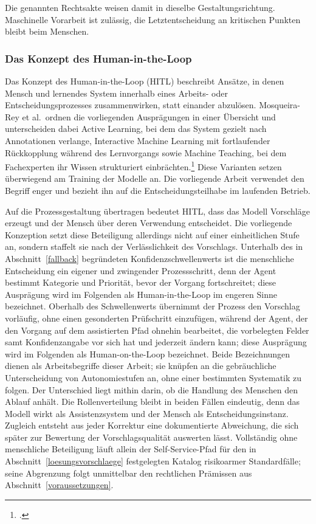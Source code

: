 Die genannten Rechtsakte weisen damit in dieselbe Gestaltungsrichtung. Maschinelle Vorarbeit ist zul\"assig, die Letztentscheidung an kritischen Punkten bleibt beim Menschen.

\subsubsection{Das Konzept des \glqq Human-in-the-Loop\grqq{}}
\label{hitl}

Das Konzept des Human-in-the-Loop (HITL) beschreibt Ans\"atze, in denen Mensch und lernendes System innerhalb eines Arbeits- oder Entscheidungsprozesses zusammenwirken, statt einander abzul\"osen. Mosqueira-Rey et al.~ordnen die vorliegenden Auspr\"agungen in einer \"Ubersicht und unterscheiden dabei Active Learning, bei dem das System gezielt nach Annotationen verlange, Interactive Machine Learning mit fortlaufender R\"uckkopplung w\"ahrend des Lernvorgangs sowie Machine Teaching, bei dem Fachexperten ihr Wissen strukturiert einbr\"achten.\footcite[Vgl.][hier S.~3006]{MosqueiraRey2023} Diese Varianten setzen \"uberwiegend am Training der Modelle an. Die vorliegende Arbeit verwendet den Begriff enger und bezieht ihn auf die Entscheidungsteilhabe im laufenden Betrieb.

Auf die Prozessgestaltung \"ubertragen bedeutet HITL, dass das Modell Vorschl\"age erzeugt und der Mensch \"uber deren Verwendung entscheidet. Die vorliegende Konzeption setzt diese Beteiligung allerdings nicht auf einer einheitlichen Stufe an, sondern staffelt sie nach der Verl\"asslichkeit des Vorschlags. Unterhalb des in Abschnitt~\ref{fallback} begr\"undeten Konfidenzschwellenwerts ist die menschliche Entscheidung ein eigener und zwingender Prozessschritt, denn der Agent bestimmt Kategorie und Priorit\"at, bevor der Vorgang fortschreitet; diese Auspr\"agung wird im Folgenden als Human-in-the-Loop im engeren Sinne bezeichnet. Oberhalb des Schwellenwerts \"ubernimmt der Prozess den Vorschlag vorl\"aufig, ohne einen gesonderten Pr\"ufschritt einzuf\"ugen, w\"ahrend der Agent, der den Vorgang auf dem assistierten Pfad ohnehin bearbeitet, die vorbelegten Felder samt Konfidenzangabe vor sich hat und jederzeit \"andern kann; diese Auspr\"agung wird im Folgenden als Human-on-the-Loop bezeichnet. Beide Bezeichnungen dienen als Arbeitsbegriffe dieser Arbeit; sie kn\"upfen an die gebr\"auchliche Unterscheidung von Autonomiestufen an, ohne einer bestimmten Systematik zu folgen. Der Unterschied liegt mithin darin, ob die Handlung des Menschen den Ablauf anh\"alt. Die Rollenverteilung bleibt in beiden F\"allen eindeutig, denn das Modell wirkt als Assistenzsystem und der Mensch als Entscheidungsinstanz. Zugleich entsteht aus jeder Korrektur eine dokumentierte Abweichung, die sich sp\"ater zur Bewertung der Vorschlagsqualit\"at auswerten l\"asst. Vollst\"andig ohne menschliche Beteiligung l\"auft allein der Self-Service-Pfad f\"ur den in Abschnitt~\ref{loesungsvorschlaege} festgelegten Katalog risikoarmer Standardf\"alle; seine Abgrenzung folgt unmittelbar den rechtlichen Pr\"amissen aus Abschnitt~\ref{voraussetzungen}.

